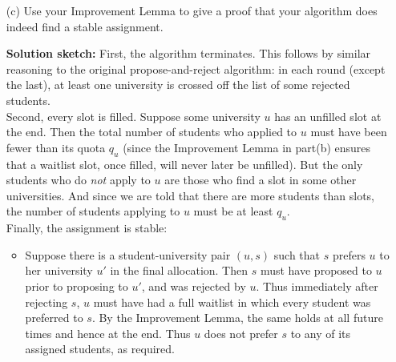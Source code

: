 \documentclass[11pt]{article}
\newif\ifsolutions
\newcommand{\sketch}{\textbf{Solution sketch:}}
\begin{document}
\begin{qunlist}
\begin{itemize}
\ifsolutions
\sketch
\begin{itemize}
\item[Improvement Lemma] Assume that universities maintain their waitlist in decreasing order of
their preference for the students on the lists.
For any university $u$, let $q_u$ be its quota and let $s_i^k \in \{Students\}\cup\{\oplus\}$
be the student in the $i$'th position on the waitlist after the $k$'th round of the algorithm.
(If there are fewer than $q_u$ students on the list, we fill the bottom of the list with $\oplus$'s.)
Then for all $i$ and $k$, $s_i^k \geq s_i^{k-1}$. 
(Here we assume that the university prefers any student to $\oplus$.)
\end{itemize}
In short, the lemma says that no position in the list ever gets worse for the university as the algorithm proceeds.
To prove the lemma, consider some university $u$, index $i \leq q_u$ and a day $k \geq 2$.\\
Consider $u$'s waitlist on day $k-1$, from the algorithm, 
since no student who is in one of the top $i \leq q_u$ spots in the waitlist are rejected on day $k-1$,
they are all still on the waitlist on day $k$; 
and thus on day $k$, 
$u$ can populate the top $i$ spots with candidates at least as good as those on day $k-1$,
proving the lemma.
\fi

\qpart
\item[(c)] Use your Improvement Lemma to give a proof that your algorithm does indeed find a stable assignment.

\ifsolutions
\sketch
First, the algorithm terminates. 
This follows by similar reasoning to the original propose-and-reject algorithm:
in each round (except the last), at least one university is crossed off the list of some rejected students. \\
Second, every slot is filled. Suppose some university $u$ has an unfilled slot at the end.
Then the total number of students who applied to $u$ must have been fewer than its quota $q_u$ 
(since the Improvement Lemma in part(b) ensures that a waitlist slot, once filled, will never later be unfilled).
But the only students who do \textit{not} apply to $u$ are those who find a slot in some other universities.
And since we are told that there are more students than slots, 
the number of students applying to $u$ must be at least $q_u$. \\
Finally, the assignment is stable:
\begin{itemize}
\item Suppose there is a student-university pair $(u,s)$ such that 
$s$ prefers $u$ to her university $u'$ in the final allocation.
Then $s$ must have proposed to $u$ prior to proposing to $u'$, and was rejected by $u$.
Thus immediately after rejecting $s$, 
$u$ must have had a full waitlist in which every student was preferred to $s$.
By the Improvement Lemma, the same holds at all future times and hence at the end.
Thus $u$ does not prefer $s$ to any of its assigned students, as required.


\end{itemize}
\end{itemize}
\end{qunlist}
\end{document}
